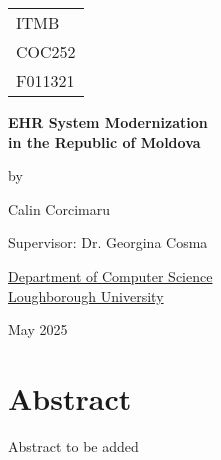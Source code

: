 

\thispagestyle{empty}

\fancypage{}{\fbox}

\begin{center}

\Large{
\hfill \begin{tabular}{l}
ITMB \\
COC252 \\
F011321
\end{tabular}
}


\vspace*{\fill}

\Large{\textbf{EHR System Modernization \\
in the Republic of Moldova}}

\vspace*{\fill}

by

\vspace*{\fill}

Calin Corcimaru


\vspace*{\fill}
Supervisor: Dr. Georgina Cosma
\vspace*{\fill}

\underline{Department of Computer Science} \\
\underline{Loughborough University}

\vspace*{\fill}
May 2025

\end{center}


\fancypage{}{}


\chapter*{Abstract}
Abstract to be added

